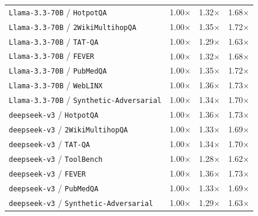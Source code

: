 \begin{longtable}{lccc}
\texttt{Llama-3.3-70B} / \texttt{HotpotQA} & 1.00$\times$ & 1.32$\times$ & 1.68$\times$ \\
\texttt{Llama-3.3-70B} / \texttt{2WikiMultihopQA} & 1.00$\times$ & 1.35$\times$ & 1.72$\times$ \\
\texttt{Llama-3.3-70B} / \texttt{TAT-QA} & 1.00$\times$ & 1.29$\times$ & 1.63$\times$ \\
\texttt{Llama-3.3-70B} / \texttt{FEVER} & 1.00$\times$ & 1.32$\times$ & 1.68$\times$ \\
\texttt{Llama-3.3-70B} / \texttt{PubMedQA} & 1.00$\times$ & 1.35$\times$ & 1.72$\times$ \\
\texttt{Llama-3.3-70B} / \texttt{WebLINX} & 1.00$\times$ & 1.36$\times$ & 1.73$\times$ \\
\texttt{Llama-3.3-70B} / \texttt{Synthetic-Adversarial} & 1.00$\times$ & 1.34$\times$ & 1.70$\times$ \\
\texttt{deepseek-v3} / \texttt{HotpotQA} & 1.00$\times$ & 1.36$\times$ & 1.73$\times$ \\
\texttt{deepseek-v3} / \texttt{2WikiMultihopQA} & 1.00$\times$ & 1.33$\times$ & 1.69$\times$ \\
\texttt{deepseek-v3} / \texttt{TAT-QA} & 1.00$\times$ & 1.34$\times$ & 1.70$\times$ \\
\texttt{deepseek-v3} / \texttt{ToolBench} & 1.00$\times$ & 1.28$\times$ & 1.62$\times$ \\
\texttt{deepseek-v3} / \texttt{FEVER} & 1.00$\times$ & 1.36$\times$ & 1.73$\times$ \\
\texttt{deepseek-v3} / \texttt{PubMedQA} & 1.00$\times$ & 1.33$\times$ & 1.69$\times$ \\
\texttt{deepseek-v3} / \texttt{Synthetic-Adversarial} & 1.00$\times$ & 1.29$\times$ & 1.63$\times$ \\
\bottomrule
\end{longtable}
